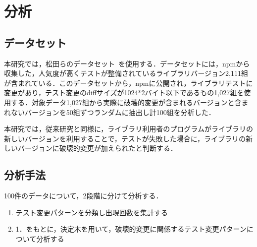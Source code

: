 \documentclass[uplatex,dvipdfmx,a4paper,twocolumn,base=11pt,jbase=11pt,ja=standard]{bxjsarticle}  %
\begin{document}
\section{分析}
\subsection{データセット}

本研究では，松田らのデータセット~\cite{FOSE2021_Matsuda}を使用する．データセットには，npmから収集した，人気度が高くテストが整備されているライブラリバージョン2,111組が含まれている．このデータセットから，npmに公開され，ライブラリテストに変更があり，テスト変更のdiffサイズが1024*2バイト以下であるもの1,027組を使用する．対象データ1,027組から実際に破壊的変更が含まれるバージョンと含まれないバージョンを50組ずつランダムに抽出し計100組を分析した．


本研究では，従来研究と同様に，ライブラリ利用者のプログラムがライブラリの新しいバージョンを利用することで，テストが失敗した場合に，ライブラリの新しいバージョンに破壊的変更が加えられたと判断する．

\subsection{分析手法}

100件のデータについて，2段階に分けて分析する．
\vspace{-2mm}
\begin{enumerate}
 \item テスト変更パターンを分類し出現回数を集計する
 \item 1．をもとに，決定木を用いて，破壊的変更に関係するテスト変更パターンについて分析する
\end{enumerate}
\end{document}
